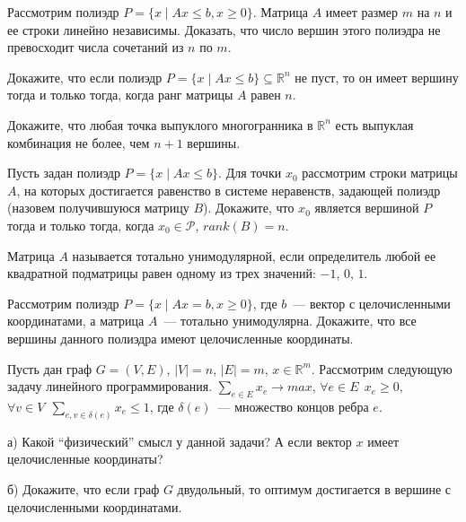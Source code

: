 \setcounter{curtask}{25}


\begin{task}
	Рассмотрим полиэдр $P = \{x \mid Ax \le b, x \ge 0\}$. Матрица $A$ имеет размер
    $m$ на $n$ и ее строки линейно независимы. Доказать, что число вершин этого
    полиэдра не превосходит числа сочетаний из $n$ по $m$.    
\end{task}

\begin{task}
   Докажите, что если полиэдр $P = \{x \mid Ax \le b\} \subseteq \mathbb{R}^n$ не пуст, то
   он имеет вершину тогда и только тогда, когда ранг матрицы $A$ равен $n$.
\end{task}

\begin{task}
    Докажите, что любая точка выпуклого многогранника в $\mathbb{R}^n$ есть выпуклая
    комбинация не более, чем $n + 1$ вершины.
\end{task}

\begin{task}
    Пусть задан полиэдр $P = \{x \mid Ax \le b\}$. Для точки $x_0$ рассмотрим строки
    матрицы $A$, на которых достигается равенство в системе неравенств, задающей
    полиэдр (назовем получившуюся матрицу $B$). Докажите, что $x_0$ является вершиной
    $P$ тогда и только тогда, когда $x_0 \in \mathcal{P}$, $rank(B) = n$.
\end{task}


Матрица $A$ называется тотально унимодулярной, если определитель любой ее квадратной
подматрицы равен одному из трех значений: $-1$, $0$, $1$.

\begin{task}
    Рассмотрим полиэдр $P = \{x \mid Ax = b, x \ge 0\}$, где $b$~--- вектор с
    целочисленными координатами, а матрица $A$~--- тотально унимодулярна. Докажите,
    что все вершины данного полиэдра имеют целочисленные координаты.
\end{task}


\begin{task}
    Пусть дан граф $G = (V, E)$, $|V| = n$, $|E| = m$, $x \in
    \mathbb{R}^m$. Рассмотрим следующую задачу линейного программирования.
    $\sum_{e \in E} x_e \rightarrow max$, $\forall e \in E ~~ x_e \ge 0$,
    $\forall v \in V ~~ \sum_{e, v \in \delta(e)} x_e \le 1$, где $\delta(e)$~---
    множество концов ребра $e$.

    а) Какой ``физический'' смысл у данной задачи? А если вектор $x$ имеет
    целочисленные координаты?

    б) Докажите, что если граф $G$ двудольный, то оптимум достигается в вершине с
    целочисленными координатами.
\end{task}



